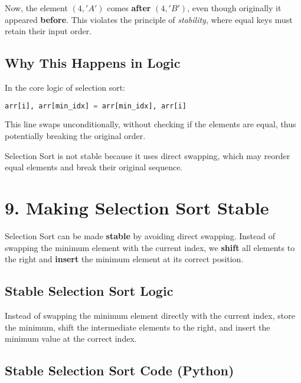\documentclass[14pt]{extarticle}
\begin{document}
Now, the element $(4, 'A')$ comes \textbf{after} $(4, 'B')$, even though originally it appeared \textbf{before}. This violates the principle of \textit{stability}, where equal keys must retain their input order.

\subsection*{Why This Happens in Logic}

In the core logic of selection sort:
\begin{lstlisting}[language=Python]
arr[i], arr[min_idx] = arr[min_idx], arr[i]
\end{lstlisting}

This line swaps unconditionally, without checking if the elements are equal, thus potentially breaking the original order.

\begin{tcolorbox}[
  colback=white,
  colframe=black,
  title=Summary
]
Selection Sort is not stable because it uses direct swapping, which may reorder equal elements and break their original sequence.
\end{tcolorbox}

\newpage
\section*{9. Making Selection Sort Stable}

Selection Sort can be made \textbf{stable} by avoiding direct swapping. Instead of swapping the minimum element with the current index, we \textbf{shift} all elements to the right and \textbf{insert} the minimum element at its correct position.

\subsection*{Stable Selection Sort Logic}

\begin{tcolorbox}[
  colback=white,
  colframe=black,
  title=Key Idea
]
Instead of swapping the minimum element directly with the current index, store the minimum, shift the intermediate elements to the right, and insert the minimum value at the correct index.
\end{tcolorbox}

\subsection*{Stable Selection Sort Code (Python)}
\end{document}
